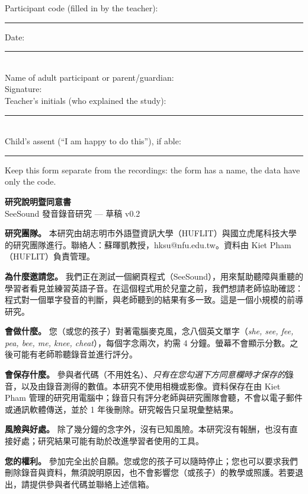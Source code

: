 \documentclass[11pt,a4paper]{article}
\begin{document}
\vspace{6pt}
\newcommand{\line}[2]{\noindent #1 \hrulefill\hspace{1em}#2 \rule{4cm}{0.4pt}\\[12pt]}
\noindent Participant code (filled in by the teacher): \rule{3.5cm}{0.4pt}\hfill Date: \rule{4cm}{0.4pt}\\[12pt]
\noindent Name of adult participant or parent/guardian: \hrulefill\\[12pt]
\noindent Signature: \hrulefill\\[12pt]
\noindent Teacher's initials (who explained the study): \rule{3cm}{0.4pt}\\[12pt]
\noindent Child's assent (``I am happy to do this''), if able: \rule{4cm}{0.4pt}

\vspace{4pt}\footnotesize Keep this form separate from the recordings: the form has a name, the data have only the code.

\newpage
\begin{center}{\Large\bfseries 研究說明暨同意書}\\[2pt]
SeeSound 發音錄音研究 --- 草稿 v0.2\end{center}

\textbf{研究團隊。} 本研究由胡志明市外語暨資訊大學（HUFLIT）與國立虎尾科技大學的研究團隊進行。聯絡人：蘇暉凱教授，hksu@nfu.edu.tw。資料由 Kiet Pham（HUFLIT）負責管理。

\textbf{為什麼邀請您。} 我們正在測試一個網頁程式（SeeSound），用來幫助聽障與重聽的學習者看見並練習英語子音。在這個程式用於兒童之前，我們想請老師協助確認：程式對一個單字發音的判斷，與老師聽到的結果有多一致。這是一個小規模的前導研究。

\textbf{會做什麼。} 您（或您的孩子）對著電腦麥克風，念八個英文單字（\textit{she, see, fee, pea, bee, me, knee, cheat}），每個字念兩次，約需 4 分鐘。螢幕不會顯示分數。之後可能有老師聆聽錄音並進行評分。

\textbf{會保存什麼。} 參與者代碼（不用姓名）、\textit{只有在您勾選下方同意欄時才保存的}錄音，以及由錄音測得的數值。本研究不使用相機或影像。資料保存在由 Kiet Pham 管理的研究用電腦中；錄音只有評分老師與研究團隊會聽，不會以電子郵件或通訊軟體傳送，並於 1 年後刪除。研究報告只呈現彙整結果。

\textbf{風險與好處。} 除了幾分鐘的念字外，沒有已知風險。本研究沒有報酬，也沒有直接好處；研究結果可能有助於改進學習者使用的工具。

\textbf{您的權利。} 參加完全出於自願。您或您的孩子可以隨時停止；您也可以要求我們刪除錄音與資料，無須說明原因，也不會影響您（或孩子）的教學或照護。若要退出，請提供參與者代碼並聯絡上述信箱。
\end{document}
